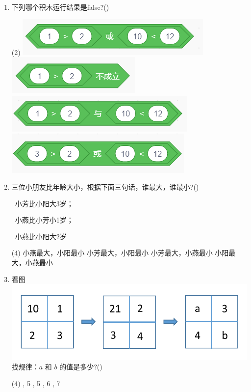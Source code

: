 \documentclass[10pt, a4paper]{article}
\begin{document}
\begin{enumerate}
        \item 下列哪个积木运行结果是false?(\qquad)
        \begin{tasks}(2)
            \task \includegraphics[width=.2\textwidth]{23a.png}
            \task \includegraphics[width=.15\textwidth]{23b.png}
            \task \includegraphics[width=.2\textwidth]{23c.png}
            \task \includegraphics[width=.2\textwidth]{23d.png}
        \end{tasks}

        \newpage
        \item 三位小朋友比年龄大小，根据下面三句话，谁最大，谁最小?(\qquad)
        
        ~小芳比小阳大3岁；

        ~小燕比小芳小1岁；

        ~小燕比小阳大2岁
        \begin{tasks}(4)
            \task 小燕最大，小阳最小
            \task 小芳最大，小阳最小
            \task 小芳最大，小燕最小
            \task 小阳最大，小燕最小
        \end{tasks}

        \item 看图 \includegraphics[width=.25\textwidth]{25.png} 找规律：$a$ 和 $b$ 的值是多少?(\qquad)
        \begin{tasks}(4)
            , 5
            , 5
            , 6
            , 7
        \end{tasks}
    \end{enumerate}
\end{document}
